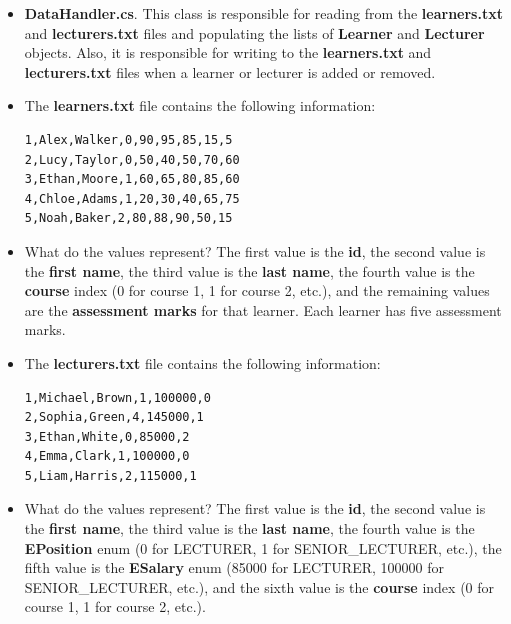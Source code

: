 \documentclass{article}
\begin{document}
\begin{itemize}
    \item \textbf{DataHandler.cs}. This class is responsible for reading from the \textbf{learners.txt} and \textbf{lecturers.txt} files and populating the lists of \textbf{Learner} and \textbf{Lecturer} objects. Also, it is responsible for writing to the \textbf{learners.txt} and \textbf{lecturers.txt} files when a learner or lecturer is added or removed.
    \item The \textbf{learners.txt} file contains the following information:
            \begin{verbatim}
1,Alex,Walker,0,90,95,85,15,5  
2,Lucy,Taylor,0,50,40,50,70,60  
3,Ethan,Moore,1,60,65,80,85,60  
4,Chloe,Adams,1,20,30,40,65,75  
5,Noah,Baker,2,80,88,90,50,15  
            \end{verbatim}
            \item What do the values represent? The first value is the \textbf{id}, the second value is the \textbf{first name}, the third value is the \textbf{last name}, the fourth value is the \textbf{course} index (0 for course 1, 1 for course 2, etc.), and the remaining values are the \textbf{assessment marks} for that learner. Each learner has five assessment marks.
            \item The \textbf{lecturers.txt} file contains the following information:
        \begin{verbatim}
1,Michael,Brown,1,100000,0
2,Sophia,Green,4,145000,1
3,Ethan,White,0,85000,2
4,Emma,Clark,1,100000,0
5,Liam,Harris,2,115000,1
        \end{verbatim}
        \item What do the values represent? The first value is the \textbf{id}, the second value is the \textbf{first name}, the third value is the \textbf{last name}, the fourth value is the \textbf{EPosition} enum (0 for LECTURER, 1 for SENIOR\_LECTURER, etc.), the fifth value is the \textbf{ESalary} enum (85000 for LECTURER, 100000 for SENIOR\_LECTURER, etc.), and the sixth value is the \textbf{course} index (0 for course 1, 1 for course 2, etc.).

\end{itemize}
\end{document}
